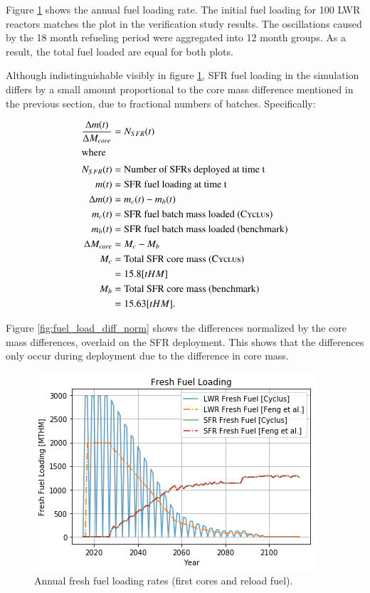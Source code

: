 Figure \ref{fig:fuel_load} shows the annual fuel loading rate.
The initial fuel loading for 100 \gls{LWR} reactors matches
the plot in the verification
study results. The oscillations caused by the 18 month refueling period
were aggregated into 12 month groups. As a result, the total fuel loaded
are equal for both plots.

Although indistinguishable visibly in figure \ref{fig:fuel_load}, \gls{SFR} fuel 
loading in the \Cyclus simulation differs by a small amount proportional
to the core mass difference mentioned in the previous section, due to fractional 
numbers of batches. Specifically:

\begin{align*} 
        \frac{\Delta m(t)}{\Delta M_{core}} & = N_{SFR}(t)\\ 
        \intertext{where}
        N_{SFR}(t) &= \text{Number of SFRs deployed at time t}\\
        m(t) &= \text{SFR fuel loading at time t}  \\
        \Delta m(t) &= m_{c}(t) - m_{b}(t)\\
        m_c(t) &= \mbox{SFR fuel batch mass loaded (\textsc{Cyclus})}\\
        m_b(t) &= \mbox{SFR fuel batch mass loaded (benchmark)}\\
        \Delta M_{core} &= M_c - M_b \\
        M_c &= \mbox{Total SFR core mass (\textsc{Cyclus})}\\ 
                &= 15.8 [tHM]\\
        M_b &= \mbox{Total SFR core mass (benchmark)}\\ 
                &= 15.63 [tHM].
\end{align*}

Figure \ref{fig:fuel_load_diff_norm} shows the
differences normalized by the core mass differences, overlaid on the
\gls{SFR} deployment. This shows that the differences only occur during
deployment due to the difference in core mass.

\begin{figure}[htbp!]
    \begin{center}
        \includegraphics[scale=0.5]{./images/results_18/fuel_load.png}
    \end{center}
        \caption{Annual fresh fuel loading rates (first cores and reload fuel).}
    \label{fig:fuel_load}
\end{figure}


